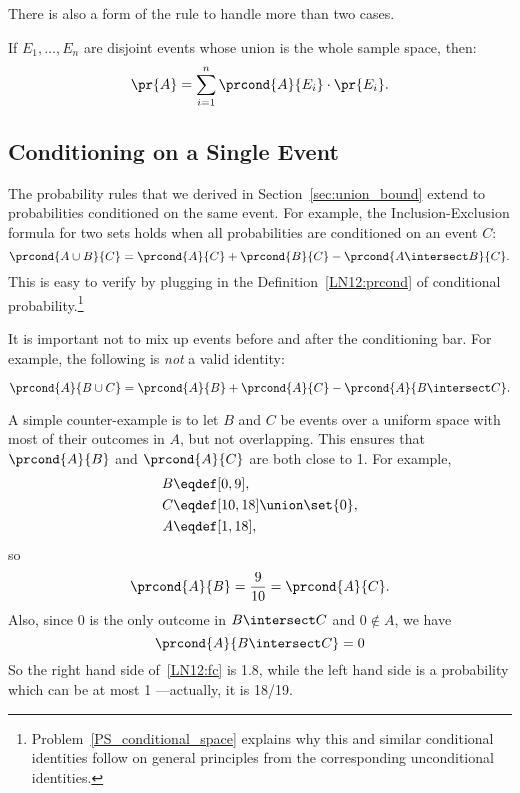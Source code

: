 There is also a form of the rule to handle more than two cases.
\begin{rul}
If $E_1, \dots, E_n$ are disjoint events whose union is the whole
sample space, then:
\[
\pr{A} = \sum_{i=1}^{n} \prcond{A}{E_i} \cdot \pr{E_i}.
\]
\end{rul}

\subsection{Conditioning on a Single Event}\label{cond_ident_subsec}

The probability rules that we derived in Section~\ref{sec:union_bound}
extend to probabilities conditioned on the same event.  For example,
the Inclusion-Exclusion formula for two sets holds when all
probabilities are conditioned on an event $C$:
\[
\prcond{A \cup B}{C} = \prcond{A}{C} + \prcond{B}{C} - \prcond{A \intersect B}{C}.
\]
This is easy to verify by plugging in the Definition~\ref{LN12:prcond}
of conditional
probability.\footnote{Problem~\ref{PS_conditional_space} explains why
  this and similar conditional identities follow on general principles
  from the corresponding unconditional identities.}

\iffalse
This follows from the fact that if $\pr{C} \neq 0$, then
\begin{align*}
\prcond{A \union B}{C}
    &= \frac{\pr{(A \union B) \intersect C}}{\pr{C}} \\[3pt]
    &= \frac{\pr{(A \intersect C) \union (B \intersect C)}}{\pr{C}} \\[3pt]
    &= \frac{\pr{A \intersect C} + \pr{B \intersect C}
             - \pr{A \intersect B \intersect C}}
            {\pr{C}} \\[3pt]
    &= \prcond{A}{C} + \prcond{B}{C} - \prcond{A \intersect B}{C}.
\end{align*}
\fi

It is important not to mix up events before and after the conditioning
bar.  For example, the following is \emph{not} a valid identity:
%
\begin{falseclm*}
\begin{equation}\label{LN12:fc}
\prcond{A}{B \cup C} = \prcond{A}{B} + \prcond{A}{C} - \prcond{A}{B \intersect C}.
\end{equation}
\end{falseclm*}


A simple counter-example is to let $B$ and $C$ be events over a
uniform space with most of their outcomes in $A$, but not overlapping.
This ensures that $\prcond{A}{B}$ and $\prcond{A}{C}$ are both close
to 1.  For example,
\begin{align*}
B & \eqdef [0,9],\\
C & \eqdef [10,18] \union \set{0},\\
A & \eqdef [1,18],
\end{align*}
so
\[
\prcond{A}{B} = \frac{9}{10} = \prcond{A}{C}.
\]
Also, since 0 is the only outcome in $B \intersect C$ and $0 \notin
A$, we have
\[
\prcond{A}{B \intersect C} = 0
\]
So the right hand side of~\eqref{LN12:fc} is 1.8, while the left hand
side is a probability which can be at most 1 ---actually, it is 18/19.

